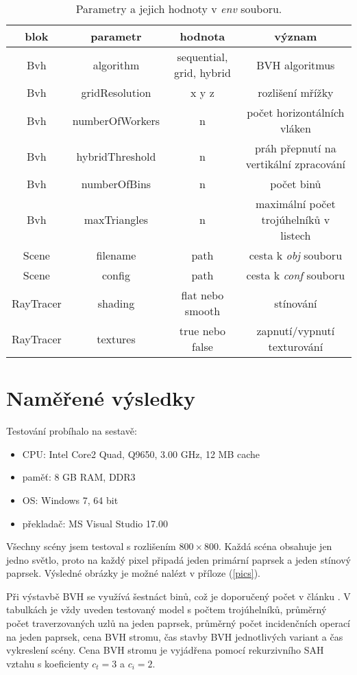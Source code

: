 \documentclass[11pt]{article}
\begin{document}
\begin{table}[h]
\begin{center}
\begin{tabular}{|c|c|c|c|}
\hline
\textbf{blok} & \textbf{parametr} & \textbf{hodnota} & \textbf{význam}\\
\hline
Bvh & algorithm & sequential, grid, hybrid & BVH algoritmus\\
\hline
Bvh & gridResolution & x y z & rozlišení mřížky\\
\hline
Bvh & numberOfWorkers & n & počet horizontálních vláken\\
\hline
Bvh & hybridThreshold  & n & práh přepnutí na vertikální zpracování\\
\hline
Bvh & numberOfBins & n & počet binů\\
\hline
Bvh & maxTriangles & n & maximální počet trojúhelníků v listech\\
\hline
Scene & filename & path & cesta k \emph{obj} souboru\\
\hline
Scene & config & path & cesta k \emph{conf} souboru\\
\hline
RayTracer & shading & flat nebo smooth & stínování\\
\hline
RayTracer & textures & true nebo false & zapnutí/vypnutí texturování\\
\hline
\end{tabular}
\end{center}
\caption{Parametry a jejich hodnoty v \emph{env} souboru.}
\label{env}
\end{table}

\section{Naměřené výsledky}
Testování probíhalo na sestavě:
\begin{itemize}
\item CPU: Intel Core2 Quad, Q9650, 3.00 GHz, 12 MB cache
\item paměť: 8 GB RAM, DDR3
\item OS: Windows 7, 64 bit
\item překladač: MS Visual Studio 17.00
\end{itemize}

\noindent
Všechny scény jsem testoval s rozlišením $800 \times 800$. Každá scéna obsahuje jen jedno světlo, proto na každý pixel připadá jeden primární paprsek a jeden stínový paprsek. Výsledné obrázky je možné nalézt v příloze (\ref{pics}). 

Při výstavbě BVH se využívá šestnáct binů, což je doporučený počet v článku \cite{wald}. V tabulkách je vždy uveden testovaný model s počtem trojúhelníků, průměrný počet traverzovaných uzlů na jeden paprsek, průměrný počet incidenčních operací na jeden paprsek, cena BVH stromu, čas stavby BVH jednotlivých variant a čas vykreslení scény. Cena BVH stromu je vyjádřena pomocí rekurzivního SAH vztahu s koeficienty $c_t = 3$ a $c_i = 2$.
\end{document}
